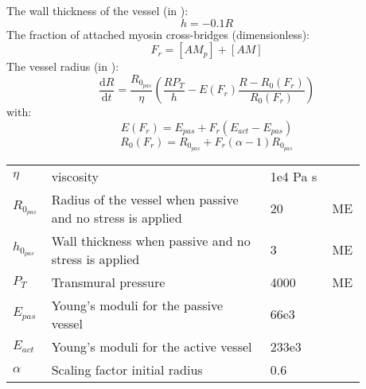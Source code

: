 The wall thickness of the vessel (in \um):
\begin{equation} \label{eq:h2}
h=-0.1R
\end{equation}
%
The fraction of attached myosin cross-bridges (dimensionless):
\begin{equation}
F_r = [AM_p] + [AM]
\end{equation}
%
The vessel radius (in \um):
\begin{equation} \label{eq:dRdt2}
\dfrac{\mathrm{d}R}{\mathrm{d}t}= \frac{R_{0_{pas}}}{\eta}\left(   \frac{ R P_{T}}{h}  - E(F_r) \frac{R - R_0(F_r)}{R_0(F_r)} \right)
\end{equation}
%
with:
\begin{equation}
E(F_r)= E_{pas} + F_r \left(E_{act} - E_{pas} \right)
\end{equation}
%
\begin{equation}
R_0(F_r)=R_{0_{pas}} + F_r (\alpha -1) R_{0_{pas}}
\end{equation}
%
\begin{table}[h!]
\centering
\begin{tabular}{| p{0.09\linewidth} | >{\footnotesize} p{0.6\linewidth} | >{\footnotesize} p{0.17\linewidth} | >{\footnotesize} p{0.02\linewidth} |}
\arrayrulecolor{lightgrey}\hline
$\eta   $				& viscosity															& 1e4 Pa s 		&  \cite{Koenigsberger2006}\\
$R_{0_{pas}}$			& Radius of the vessel when passive and no stress is applied		& 20  \um 		& ME \\
$h_{0_{pas}}$			& Wall thickness when passive and no stress is applied				& 3   \um		& ME \\
$P_T$					& Transmural pressure												& 4000 \Pa		& ME \\
${E}_{pas}$				& Young's moduli for the passive vessel								& 66e3 \Pa 		&  \cite{Gore}\\
${E}_{act}$				&  Young's moduli for the active vessel	& 233e3 \Pa 	& \cite{Gore}\\
$\alpha$				& Scaling factor initial radius										& 0.6    		& \cite{Gore}\\
\hline
\end{tabular}
\label{tab:radius}
\end{table}


